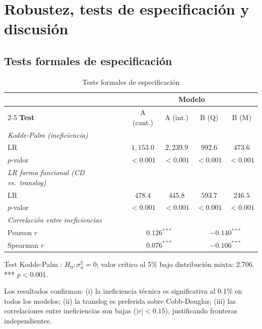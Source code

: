 ﻿\chapter{Robustez, tests de especificación y discusión}
\label{ch:robustez}

\section{Tests formales de especificación}

\begin{table}[htbp]
\centering
\caption{Tests formales de especificación}
\label{tab:tests_spec}
\begin{threeparttable}
\begin{tabular}{lcccc}
\toprule
& \multicolumn{4}{c}{\textbf{Modelo}} \\
\cmidrule{2-5}
\textbf{Test} & A (cant.) & A (int.) & B (Q) & B (M) \\
\midrule
\textit{Kodde-Palm (ineficiencia)} \\
\quad LR & $1{,}153.0$ & $2{,}239.9$ & $992.6$ & $473.6$ \\
\quad $p$-valor & $<0.001$ & $<0.001$ & $<0.001$ & $<0.001$ \\[4pt]
\textit{LR forma funcional (CD vs.\ translog)} \\
\quad LR & $478.4$ & $445.8$ & $593.7$ & $246.5$ \\
\quad $p$-valor & $<0.001$ & $<0.001$ & $<0.001$ & $<0.001$ \\[4pt]
\textit{Correlación entre ineficiencias} \\
\quad Pearson $r$ & \multicolumn{2}{c}{$0.126^{***}$}
  & \multicolumn{2}{c}{$-0.140^{***}$} \\
\quad Spearman $r$ & \multicolumn{2}{c}{$0.076^{***}$}
  & \multicolumn{2}{c}{$-0.106^{***}$} \\
\bottomrule
\end{tabular}
\begin{tablenotes}
  \small
  \item Test Kodde-Palm \citep{kodde1986}: $H_0: \sigma^2_u = 0$; valor crítico al 5\% bajo distribución mixta: 2.706. *** $p<0.001$.
\end{tablenotes}
\end{threeparttable}
\end{table}

Los resultados confirman: (i) la ineficiencia técnica es significativa al 0.1\% en todos los modelos; (ii) la translog es preferida sobre Cobb-Douglas; (iii) las correlaciones entre ineficiencias son bajas ($|r|<0.15$), justificando fronteras independientes.

